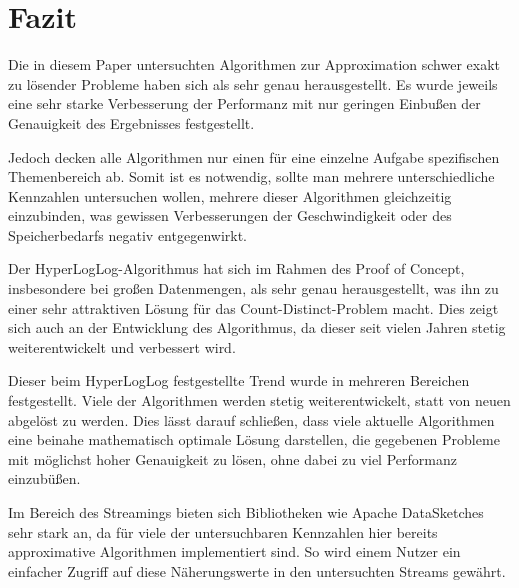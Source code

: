 \section{Fazit}

Die in diesem Paper untersuchten Algorithmen zur Approximation schwer exakt zu lösender Probleme haben sich als sehr genau herausgestellt.
Es wurde jeweils eine sehr starke Verbesserung der Performanz mit nur geringen Einbußen der Genauigkeit des Ergebnisses festgestellt.

Jedoch decken alle Algorithmen nur einen für eine einzelne Aufgabe spezifischen Themenbereich ab.
Somit ist es notwendig, sollte man mehrere unterschiedliche Kennzahlen untersuchen wollen, mehrere dieser Algorithmen gleichzeitig einzubinden, was gewissen Verbesserungen der Geschwindigkeit oder des Speicherbedarfs negativ entgegenwirkt.

Der HyperLogLog-Algorithmus hat sich im Rahmen des Proof of Concept, insbesondere bei großen Datenmengen, als sehr genau herausgestellt, was ihn zu einer sehr attraktiven Lösung für das Count-Distinct-Problem macht.
Dies zeigt sich auch an der Entwicklung des Algorithmus, da dieser seit vielen Jahren stetig weiterentwickelt und verbessert wird.

Dieser beim HyperLogLog festgestellte Trend wurde in mehreren Bereichen festgestellt.
Viele der Algorithmen werden stetig weiterentwickelt, statt von neuen abgelöst zu werden.
Dies lässt darauf schließen, dass viele aktuelle Algorithmen eine beinahe mathematisch optimale Lösung darstellen, die gegebenen Probleme mit möglichst hoher Genauigkeit zu lösen, ohne dabei zu viel Performanz einzubüßen.

Im Bereich des Streamings bieten sich Bibliotheken wie Apache DataSketches sehr stark an, da für viele der untersuchbaren Kennzahlen hier bereits approximative Algorithmen implementiert sind.
So wird einem Nutzer ein einfacher Zugriff auf diese Näherungswerte in den untersuchten Streams gewährt.